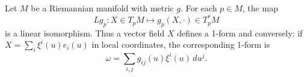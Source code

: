 Let $M$ be a Riemannian manifold with metric $g$. For each $p \in M$, the map
$$Lg_p: X \in T_pM \mapsto g_p(X, \cdot) \in T_p^*M$$
is a linear isomorphism. Thus a vector field $X$ defines a 1-form and conversely: if $X = \sum_i \xi^i(u) e_i(u)$ in local coordinates, the corresponding 1-form is
$$\omega = \sum_{i,j} g_{ij}(u) \xi^i(u) \, du^j.$$